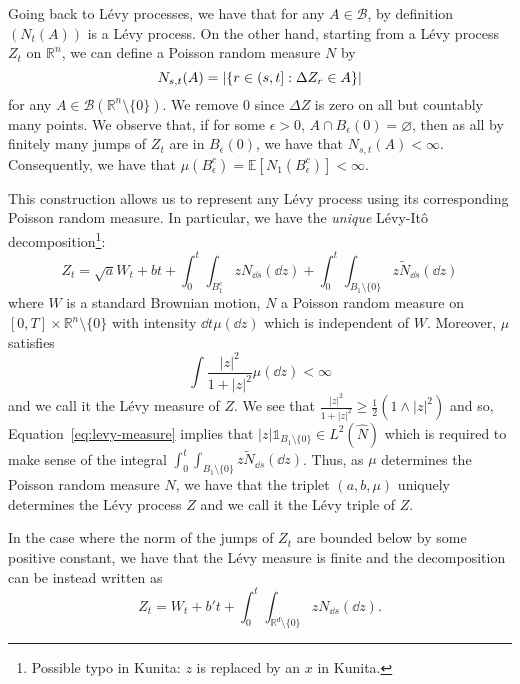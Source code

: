 \documentclass[]{article}
\theoremstyle{definition}
\theoremstyle{definition}
\begin{document}
Going back to L\'evy processes, we have that for any \(A \in \mathcal{B}\), by definition \((N_t(A))\) 
is a L\'evy process. On the other hand, starting from a L\'evy process \(Z_t\) on \(\mathbb{R}^n\), 
we can define a Poisson random measure \(N\) by 
\[N_{s, t}(A) = \abs{\{r \in (s, t] : \Delta Z_r \in A\}}\]
for any \(A \in \mathcal{B}(\mathbb{R}^n \setminus \{0\})\). We remove \(0\) since \(\Delta Z\) is zero on 
all but countably many points. We observe that, if for some \(\epsilon > 0\), 
\(A \cap B_\epsilon(0) = \varnothing\), then as all by finitely many jumps of \(Z_t\) are in \(B_\epsilon(0)\), 
we have that \(N_{s, t}(A) < \infty\). Consequently, we have that \(\mu(B_\epsilon^c) = \mathbb{E}[N_1(B_\epsilon^c)] < \infty\).

This construction allows us to represent any L\'evy process using its corresponding Poisson random measure. 
In particular, we have the \textit{unique} L\'evy-It\^o decomposition\footnote{Possible typo in Kunita: \(z\) is 
replaced by an \(x\) in Kunita.}:
\[Z_t = \sqrt{a}W_t + bt + \int_0^t \int_{B_1^c} z N_{\dd s}(\dd z) 
  + \int_0^t\int_{B_1 \setminus \{0\}} z \tilde N_{\dd s}(\dd z)\]
where \(W\) is a standard Brownian motion, \(N\) a Poisson random measure on \([0, T] \times \mathbb{R}^n \setminus \{0\}\) 
with intensity \(\dd t\mu(\dd z)\) which is independent of \(W\). Moreover, \(\mu\) satisfies 
\begin{equation}\label{eq:levy-measure}
  \int \frac{|z|^2}{1 + |z|^2} \mu(\dd z) < \infty
\end{equation}
and we call it the L\'evy measure of \(Z\). We see that \(\frac{|z|^2}{1 + |z|^2} \ge \frac{1}{2}(1 \wedge |z|^2)\) 
and so, Equation~\eqref{eq:levy-measure} implies that \(|z|\mathbb{1}_{B_1\setminus\{0\}} \in L^2(\hat N)\) which is 
required to make sense of the integral \(\int_0^t \int_{B_1 \setminus \{0\}} z \tilde N_{\dd s}(\dd z)\).
Thus, as \(\mu\) determines the Poisson random measure \(N\), 
we have that the triplet \((a, b, \mu)\) uniquely determines the L\'evy process \(Z\) and we call it the 
L\'evy triple of \(Z\).

In the case where the norm of the jumps of \(Z_t\) are bounded below by some positive constant, we have that the 
L\'evy measure is finite and the decomposition can be instead written as 
\[Z_t = W_t + b't + \int_0^t \int_{\mathbb{R}^d \setminus \{0\}} z N_{\dd s}(\dd z).\]
\end{document}
